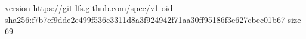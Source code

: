 version https://git-lfs.github.com/spec/v1
oid sha256:f7b7ef9dde2e499f536c3311d8a3f924942f71aa30ff95186f3e627cbec01b67
size 69
